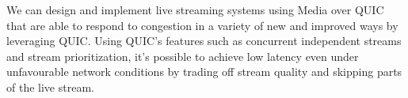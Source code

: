 We can design and implement live streaming systems using Media over QUIC that are able to respond to congestion in a variety of new and improved ways by leveraging QUIC. Using QUIC's features such as concurrent independent streams and stream prioritization, it's possible to achieve low latency even under unfavourable network conditions by trading off stream quality and skipping parts of the live stream.